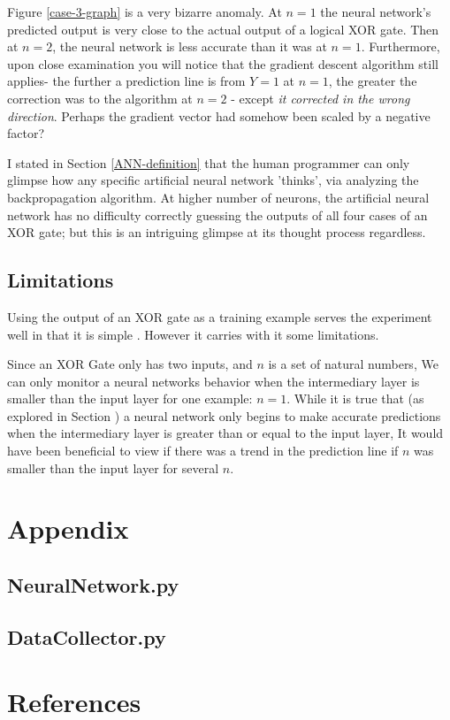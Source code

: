 \documentclass[12pt]{article}
\begin{document}
Figure \ref{case-3-graph} is a very bizarre anomaly. At $n = 1$ the neural network's predicted output is very close to the actual output of a logical XOR gate. Then at $n = 2$, the neural network is less accurate than it was at $n = 1$. Furthermore, upon close examination you will notice that the gradient descent algorithm still applies- the further a prediction line is from $Y = 1$ at $n = 1$, the greater the correction was to the algorithm at $n = 2$ - except \textit{it corrected in the wrong direction}. Perhaps the gradient vector had somehow been scaled by a negative factor?

I stated in Section \ref{ANN-definition} that the human programmer can only glimpse how any specific artificial neural network 'thinks', via analyzing the backpropagation algorithm. At higher number of neurons, the artificial neural network has no difficulty correctly guessing the outputs of all four cases of an XOR gate; but this is an intriguing glimpse at its thought process regardless.

\subsection{Limitations}

Using the output of an XOR gate as a training example serves the experiment well in that it is simple . However it carries with it some limitations.

Since an XOR Gate only has two inputs, and $n$ is a set of natural numbers, We can only monitor a neural networks behavior when the intermediary layer is smaller than the input layer for one example: $n = 1$. While it is true that (as explored in Section \label{conclusions}) a neural network only begins to make accurate predictions when the intermediary layer is greater than or equal to the input layer, It would have been beneficial to view if there was a trend in the prediction line if $n$ was smaller than the input layer for several $n$.


\section{Appendix}

\subsection{NeuralNetwork.py \label{neuralnetpy}}


\pagebreak

\subsection{DataCollector.py\label{datacollectorpy}}


\pagebreak

\section{References}

\printbibliography[heading=none]
\end{document}
